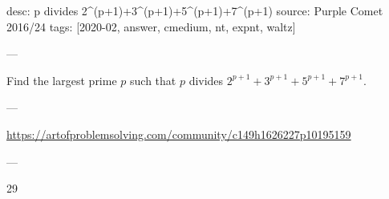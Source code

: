 desc: p divides 2^(p+1)+3^(p+1)+5^(p+1)+7^(p+1)
source: Purple Comet 2016/24
tags: [2020-02, answer, cmedium, nt, expnt, waltz]

---

Find the largest prime $p$ such that $p$ divides $2^{p+1}+3^{p+1}+5^{p+1}+7^{p+1}$.

---

\url{https://artofproblemsolving.com/community/c149h1626227p10195159}

---

29

